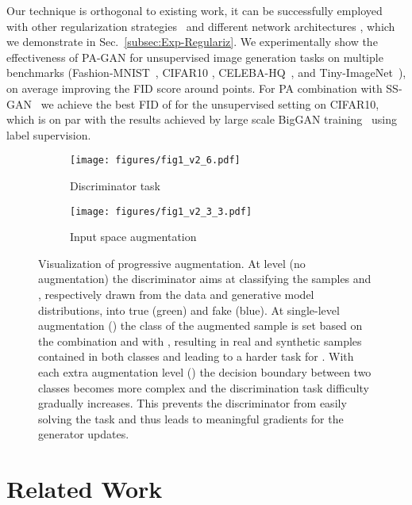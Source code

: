 \documentclass{article}
\begin{document}
Our technique is orthogonal to existing work, it can be successfully employed with other regularization strategies~\cite{Roth_NIPS2017,gulrajani_NIPS2017,SalimansNIPS2016,JMLR:v15:srivastava14a,ChenSS2019} and different network architectures \cite{miyato2018spectral,Zhang_SAGAN18}, which we demonstrate in Sec.~\ref{subsec:Exp-Regulariz}. We experimentally show the effectiveness of PA-GAN for unsupervised image generation tasks on multiple benchmarks (Fashion-MNIST~\cite{xiao2017}, CIFAR10 \cite{Cifar10_Krizhevsky09learningmultiple}, CELEBA-HQ~\cite{karras2018progressive}, and Tiny-ImageNet~\cite{imagenet_cvpr09}), on average improving the FID score around  points. For PA combination with SS-GAN~\cite{ChenSS2019} we achieve the best FID of  for the unsupervised setting on CIFAR10, which is on par with the results achieved by large scale BigGAN training~\cite{Brock2019} using label supervision.  


\begin{figure}[t!]\vspace{-1em}
	\centering
	\begin{subfigure}{0.4\textwidth}
			\centering
\texttt{[image: figures/fig1\_v2\_6.pdf]} \caption{Discriminator task}
	\end{subfigure}
\begin{subfigure}{0.45\textwidth}
		\centering
\texttt{[image: figures/fig1\_v2\_3\_3.pdf]} \caption{Input space augmentation}
\end{subfigure}
	\caption{\label{fig:Data_augmentation}
		Visualization of progressive augmentation.
		At level  (no augmentation) the discriminator  aims at classifying the samples  and  , respectively drawn from the data  and generative model  distributions, into true (green) and fake (blue). At single-level augmentation () the class of the augmented sample is set based on the combination  and  with , resulting in real and synthetic samples contained in both classes and leading to a harder task for .
		With each extra augmentation level () the decision boundary between two classes becomes more complex and the discrimination task difficulty gradually increases. This prevents the discriminator from easily solving the task and thus leads to meaningful gradients for the generator updates.}
		\vspace{-1em}
\end{figure}
 \section{\label{sec:Related}Related Work}	
\end{document}
